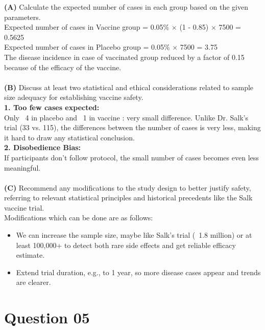 \documentclass{article}
\begin{document}
\noindent \textbf{(A)} Calculate the expected number of cases in each group
based on the given
parameters. \\[0.2cm]
\noindent Expected number of cases in Vaccine group = 0.05\% $\times$ (1 -
0.85) $\times$
7500 = 0.5625\\
Expected number of cases in Placebo group = 0.05\% $\times$ 7500 =
3.75\\[0.1cm]
\noindent The disease incidence in case of vaccinated group reduced by a factor
of 0.15
because of the efficacy of the vaccine.
\\\\
\noindent \textbf{(B)} Discuss at least two statistical and ethical
considerations related to
sample size adequacy for establishing vaccine safety. \\[0.2cm]
\textbf{1. Too few cases expected:}\\
Only ~4 in placebo and ~1 in vaccine : very small difference.
Unlike Dr. Salk's trial (33 vs. 115), the differences between the number of
cases is very less, making it hard to draw any statistical conclusion.\\
\textbf{2. Disobedience Bias:}\\
If participants don’t follow protocol, the small number of cases becomes even
less meaningful.
\\\\
\noindent \textbf{(C)} Recommend any modifications to the study design to
better justify safety,
referring to relevant statistical principles and historical precedents like
the Salk vaccine trial. \\[0.2cm]
Modifications which can be done are as follows:
\begin{itemize}
    \item We can increase the sample size, maybe like Salk's trial (~1.8
          million) or at
          least 100,000+ to detect both rare side effects and get reliable
          efficacy
          estimate.
    \item Extend trial duration, e.g., to 1 year, so more disease cases appear
          and trends are clearer.
\end{itemize}

\newpage

\section*{Question 05}
\end{document}
